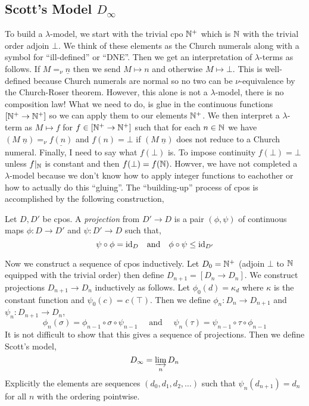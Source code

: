 \documentclass[12pt]{article}
\begin{document}
\subsection{Scott's Model $D_{\infty}$}

To build a $\lambda$-model, we start with the trivial cpo $\mathbb{N}^+$ which is $\mathbb{N}$ with the trivial order adjoin $\bot$. We think of these elements as the Church numerals along with a symbol for ``ill-defined'' or ``DNE''. Then we get an interpretation of $\lambda$-terms as follows. If $M =_\nu \underline{n}$ then we send $M \mapsto n$ and otherwise $M \mapsto \bot$. This is well-defined because Church numerals are normal so no two can be $\nu$-equivalence by the Church-Roser theorem. However, this alone is not a $\lambda$-model, there is no composition law! What we need to do, is glue in the continuous functions $[\mathbb{N}^+ \to \mathbb{N}^+]$ so we can apply them to our elements $\mathbb{N}^+$. We then interpret a $\lambda$-term as $M \mapsto f$ for $f \in [\mathbb{N}^+ \to \mathbb{N}^+]$ such that for each $n \in \mathbb{N}$ we have $(M \; \underline{n}) =_\nu \underline{f(n)}$ and $f(n) = \bot$ if $(M \; \underline{n})$ does not reduce to a Church numeral. Finally, I need to say what $f(\bot)$ is. To impose continuity $f(\bot) = \bot$ unless $f|_{\mathbb{N}}$ is constant and then $f(\bot) = f(\mathbb{N})$. Howver, we have not completed a $\lambda$-model because we don't know how to apply integer functions to eachother or how to actually do this ``gluing''. The ``building-up'' process of cpos is accomplished by the following construction,

\begin{defn}
Let $D, D'$ be cpos. A \textit{projection} from $D' \to D$ is a pair $(\phi, \psi)$ of continuous maps $\phi : D \to D'$ and $\psi : D' \to D$ such that,
\[ \psi \circ \phi = \mathrm{id}_D \quad \text{and} \quad \phi \circ \psi \le \mathrm{id}_{D'} \]
\end{defn}


Now we construct a sequence of cpos inductively. Let $D_0 = \mathbb{N}^+$ (adjoin $\bot$ to $\mathbb{N}$ equipped with the trivial order) then define $D_{n+1} = [D_n \to D_n]$. We construct projections $D_{n+1} \to D_n$ inductively as follows. Let $\phi_0(d) = \kappa_d$ where $\kappa$ is the constant function and $\psi_0(c) = c(\top)$. Then we define $\phi_n : D_n \to D_{n+1}$ and $\psi_n : D_{n+1} \to D_n$,
\[ \phi_n(\sigma) = \phi_{n-1} \circ \sigma \circ \psi_{n-1} \quad \text{ and } \quad \psi_n(\tau) = \psi_{n-1} \circ \tau \circ \phi_{n-1} \]
It is not difficult to show that this gives a sequence of projections. Then we define Scott's model,
\[ D_{\infty} = \varinjlim_{n} D_n \]
Explicitly the elements are sequences $(d_0, d_1, d_2, \dots)$ such that $\psi_n(d_{n+1}) = d_{n}$ for all $n$ with the ordering pointwise. 
\end{document}
